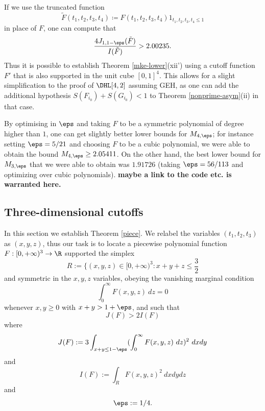 \begin{remark}  If we use the truncated function
$$ \tilde F(t_1,t_2,t_3,t_4) \coloneqq F(t_1,t_2,t_3,t_4) 1_{t_1,t_2,t_3,t_4 \leq 1}$$
in place of $F$, one can compute that
$$ \frac{4 J_{1,1-\eps}(\tilde F)}{I(\tilde F)} > 2.00235.$$
Thus it is possible to establish Theorem \ref{mke-lower}(xii') using a cutoff function $F'$ that is also supported in the unit cube $[0,1]^4$.  This allows for a slight simplification to the proof of $\DHL[4,2]$ assuming GEH, as one can add the additional hypothesis $S(F_{i_0})+S(G_{i_0}) < 1$ to Theorem \ref{nonprime-asym}(ii) in that case.
\end{remark}

\begin{remark} By optimising in $\eps$ and taking $F$ to be a symmetric polynomial of degree higher than $1$, one can get slightly better lower bounds for $M_{4,\eps}$; for instance setting $\eps = 5/21$ and choosing $F$ to be a cubic polynomial, we were able to obtain the bound $M_{4,\eps} \geq 2.05411$.  On the other hand, the best lower bound for $M_{3,\eps}$ that we were able to obtain was $1.91726$ (taking $\eps = 56/113$ and optimizing over cubic polynomials).  {\bf maybe a link to the code etc. is warranted here.}
\end{remark}

\subsection{Three-dimensional cutoffs}\label{3d}

In this section we establish Theorem \ref{piece}.  We relabel the variables $(t_1,t_2,t_3)$ as $(x,y,z)$, thus our task is to locate a piecewise polynomial function 
$F: [0,+\infty)^3 \to \R$ supported the simplex
$$ R := \{ (x,y,z) \in [0,+\infty)^3: x+y+z \leq \frac{3}{2}$$
and symmetric in the $x,y,z$ variables, obeying the vanishing marginal condition
\begin{equation}\label{fmor}
\int_0^\infty F(x,y,z)\ dz = 0
\end{equation}
whenever $x,y \geq 0$ with $x+y > 1+\eps$, and such that
\begin{equation}\label{tt1}
J(F) > 2 I(F)
\end{equation}
where
\begin{equation}\label{jf-def}
J(F) := 3\int_{x+y \leq 1-\eps} (\int_0^\infty F(x,y,z)\ dz)^2\ dx dy
\end{equation}
and
\begin{equation}\label{if-def}
I(F) := \int_R  F(x,y,z)^2\ dx dy dz
\end{equation}
and
$$\eps := 1/4.$$

